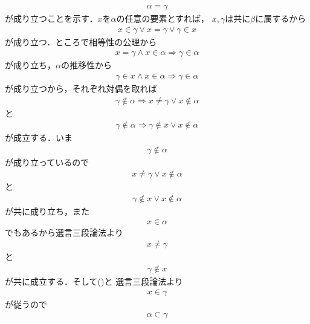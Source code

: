 \begin{prf}
		
		\begin{align}
			\alpha = \gamma
		\end{align}
		が成り立つことを示す．$x$を$\alpha$の任意の要素とすれば，
		$x,\gamma$は共に$\beta$に属するから
		\begin{align}
			x \in \gamma \vee x = \gamma \vee \gamma \in x
			\label{eq:thm_element_and_proper_subset_correspond_between_ordinal_numbers_1}
		\end{align}
		が成り立つ．ところで相等性の公理から
		\begin{align}
			x = \gamma \wedge x \in \alpha \Longrightarrow \gamma \in \alpha
		\end{align}
		が成り立ち，$\alpha$の推移性から
		\begin{align}
			\gamma \in x \wedge x \in \alpha \Longrightarrow \gamma \in \alpha
		\end{align}
		が成り立つから，それぞれ対偶を取れば
		\begin{align}
			\gamma \notin \alpha \Longrightarrow x \neq \gamma \vee x \notin \alpha
		\end{align}
		と
		\begin{align}
			\gamma \notin \alpha \Longrightarrow \gamma \notin x \vee x \notin \alpha
		\end{align}
		が成立する．いま
		\begin{align}
			\gamma \notin \alpha
		\end{align}
		が成り立っているので
		\begin{align}
			x \neq \gamma \vee x \notin \alpha
		\end{align}
		と
		\begin{align}
			\gamma \notin x \vee x \notin \alpha
		\end{align}
		が共に成り立ち，また
		\begin{align}
			x \in \alpha
		\end{align}
		でもあるから選言三段論法より
		\begin{align}
			x \neq \gamma
		\end{align}
		と
		\begin{align}
			\gamma \notin x
		\end{align}
		が共に成立する．そして()と
		選言三段論法より
		\begin{align}
			x \in \gamma
		\end{align}
		が従うので
		\begin{align}
			\alpha \subset \gamma
		\end{align}

\end{prf}
